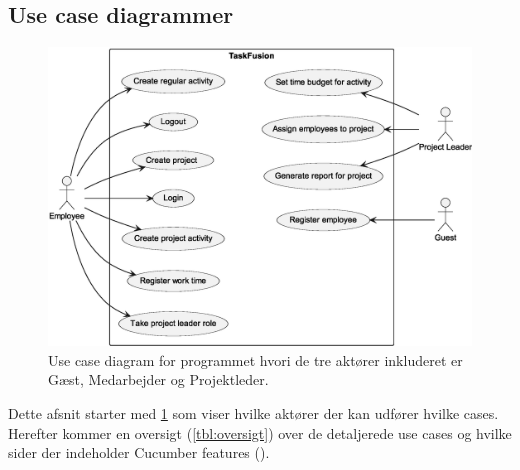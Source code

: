 \subsection{Use case diagrammer}
\begin{figure}[H]
    \centering
    \caption{Use case diagram for programmet hvori de tre aktører inkluderet er Gæst, Medarbejder og Projektleder.}\label{fig:AlleActorsPaaEnGang}
    \includegraphics[width=.85\textwidth]{Diagrams/usecases.eps}
\end{figure}
Dette afsnit starter med \cref{fig:AlleActorsPaaEnGang} som viser hvilke aktører der kan udfører hvilke cases. Herefter kommer en oversigt (\cref{tbl:oversigt}) over de detaljerede use cases og hvilke sider der indeholder Cucumber features ().
